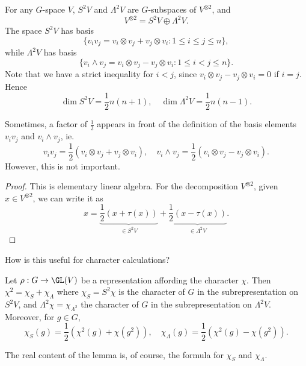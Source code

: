 \documentclass[a4paper]{article}
\begin{document}
\begin{lemma}
  For any $G$-space $V$, $S^2 V$ and $\Lambda^2 V$ are $G$-subspaces of $V^{\otimes 2}$, and
  \[
    V^{\otimes 2} = S^2 V \oplus \Lambda^2 V.
  \]
  The space $S^2 V$ has basis
  \[
    \{v_i v_j = v_i \otimes v_j + v_j \otimes v_i: 1 \leq i \leq j \leq n\},
  \]
  while $\Lambda^2 V$ has basis
  \[
    \{v_i \wedge v_j = v_i \otimes v_j - v_j \otimes v_i: 1 \leq i < j \leq n\}.
  \]
  Note that we have a strict inequality for $i < j$, since $v_i \otimes v_j - v_j \otimes v_i = 0$ if $i = j$.
  Hence
  \[
    \dim S^2 V = \frac{1}{2}n(n + 1),\quad \dim \Lambda^2 V = \frac{1}{2}n(n - 1).
  \]
\end{lemma}
Sometimes, a factor of $\frac{1}{2}$ appears in front of the definition of the basis elements $v_i v_j$ and $v_i \wedge v_j$, ie.
\[
  v_i v_j = \frac{1}{2}(v_i \otimes v_j + v_j \otimes v_i),\quad v_i \wedge v_j = \frac{1}{2}(v_i \otimes v_j - v_j \otimes v_i).
\]
However, this is not important.

\begin{proof}
  This is elementary linear algebra. For the decomposition $V^{\otimes 2}$, given $x \in V^{\otimes 2}$, we can write it as
  \[
    x = \underbrace{\frac{1}{2}(x + \tau(x))}_{\in S^2 V} + \underbrace{\frac{1}{2}(x - \tau(x))}_{\in \Lambda^2 V}.
  \]
\end{proof}

How is this useful for character calculations?
\begin{lemma}
  Let $\rho: G \to \GL(V)$ be a representation affording the character $\chi$. Then $\chi^2 = \chi_S + \chi_{\Lambda}$ where $\chi_S = S^2 \chi$ is the character of $G$ in the subrepresentation on $S^2 V$, and $\Lambda^2 \chi = \chi_{\Lambda^2}$ the character of $G$ in the subrepresentation on $\Lambda^2 V$. Moreover, for $g \in G$,
  \[
    \chi_S(g) = \frac{1}{2} (\chi^2 (g) + \chi(g^2)),\quad \chi_\Lambda(g) = \frac{1}{2}(\chi^2(g) - \chi(g^2)).
  \]
\end{lemma}
The real content of the lemma is, of course, the formula for $\chi_S$ and $\chi_\Lambda$.
\end{document}
